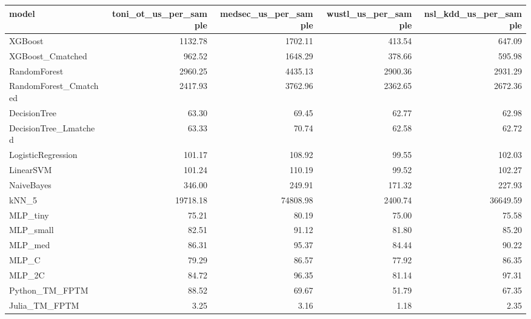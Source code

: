 \begin{tabular}{lrrrr}
\toprule
model & toni\_ot\_us\_per\_sample & medsec\_us\_per\_sample & wustl\_us\_per\_sample & nsl\_kdd\_us\_per\_sample \\
\midrule
XGBoost & 1132.78 & 1702.11 & 413.54 & 647.09 \\
XGBoost\_Cmatched & 962.52 & 1648.29 & 378.66 & 595.98 \\
RandomForest & 2960.25 & 4435.13 & 2900.36 & 2931.29 \\
RandomForest\_Cmatched & 2417.93 & 3762.96 & 2362.65 & 2672.36 \\
DecisionTree & 63.30 & 69.45 & 62.77 & 62.98 \\
DecisionTree\_Lmatched & 63.33 & 70.74 & 62.58 & 62.72 \\
LogisticRegression & 101.17 & 108.92 & 99.55 & 102.03 \\
LinearSVM & 101.24 & 110.19 & 99.52 & 102.27 \\
NaiveBayes & 346.00 & 249.91 & 171.32 & 227.93 \\
kNN\_5 & 19718.18 & 74808.98 & 2400.74 & 36649.59 \\
MLP\_tiny & 75.21 & 80.19 & 75.00 & 75.58 \\
MLP\_small & 82.51 & 91.12 & 81.80 & 85.20 \\
MLP\_med & 86.31 & 95.37 & 84.44 & 90.22 \\
MLP\_C & 79.29 & 86.57 & 77.92 & 86.35 \\
MLP\_2C & 84.72 & 96.35 & 81.14 & 97.31 \\
Python\_TM\_FPTM & 88.52 & 69.67 & 51.79 & 67.35 \\
Julia\_TM\_FPTM & 3.25 & 3.16 & 1.18 & 2.35 \\
\bottomrule
\end{tabular}
